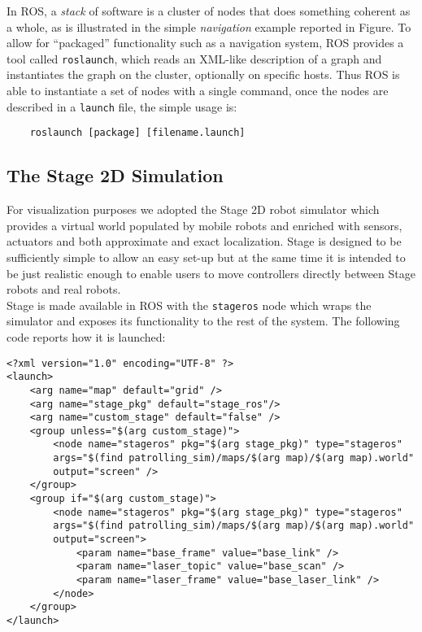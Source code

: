 In ROS, a \textit{stack} of software is a cluster of nodes that does something
coherent as a whole, as is illustrated in the simple \textit{navigation} example reported
in Figure. %
To allow for “packaged” functionality such as a navigation system, ROS provides
a tool called \texttt{roslaunch}, which reads an XML-like description of a graph and instantiates
the graph on the cluster, optionally on specific hosts.
Thus ROS is able to instantiate a set of nodes with a single
command, once the nodes are described in a \texttt{launch} file, the simple usage
is:
\begin{lstlisting}
    roslaunch [package] [filename.launch]
\end{lstlisting}

\subsection{The Stage 2D Simulation}
For visualization purposes we adopted the Stage 2D robot simulator
which provides a virtual world populated by mobile robots and enriched with
sensors, actuators and both approximate and exact localization. Stage is
designed to be sufficiently simple to allow an easy set-up but at the same time
it is intended to be just realistic enough to enable users to move controllers
directly between Stage robots and real robots. 
\\
Stage is made available in ROS with the \texttt{stageros} node which wraps the 
simulator and exposes its functionality to the rest of the system. The following 
code reports how it is launched:

\begin{lstlisting}
<?xml version="1.0" encoding="UTF-8" ?>
<launch>
    <arg name="map" default="grid" />
    <arg name="stage_pkg" default="stage_ros"/>     
    <arg name="custom_stage" default="false" />
    <group unless="$(arg custom_stage)"> 
        <node name="stageros" pkg="$(arg stage_pkg)" type="stageros" 
        args="$(find patrolling_sim)/maps/$(arg map)/$(arg map).world" 
        output="screen" />
    </group>
    <group if="$(arg custom_stage)">   
        <node name="stageros" pkg="$(arg stage_pkg)" type="stageros" 
        args="$(find patrolling_sim)/maps/$(arg map)/$(arg map).world"
        output="screen">
            <param name="base_frame" value="base_link" />
            <param name="laser_topic" value="base_scan" />
            <param name="laser_frame" value="base_laser_link" />
        </node> 
    </group>
</launch>
\end{lstlisting}

